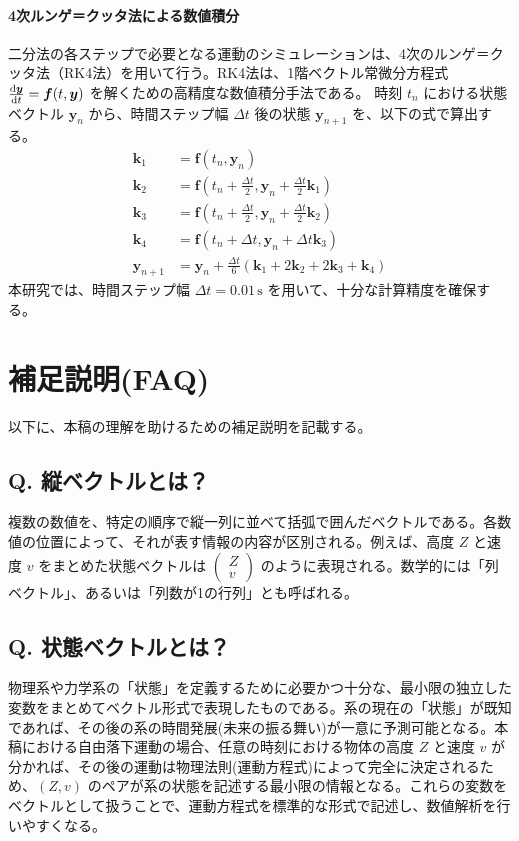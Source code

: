\documentclass[a4paper,12pt]{article}
\begin{document}
\paragraph{4次ルンゲ＝クッタ法による数値積分}
\label{par:rk4}
二分法の各ステップで必要となる運動のシミュレーションは、4次のルンゲ＝クッタ法（RK4法）を用いて行う。RK4法は、1階ベクトル常微分方程式 $\dv{\bm{y}}{t} = \bm{f}(t, \bm{y})$ を解くための高精度な数値積分手法である。
時刻 $t_n$ における状態ベクトル $\bm{y}_n$ から、時間ステップ幅 $\Delta t$ 後の状態 $\bm{y}_{n+1}$ を、以下の式で算出する。
\begin{align*}
    \bm{k}_1 &= \bm{f}(t_n, \bm{y}_n) \\
    \bm{k}_2 &= \bm{f}\left(t_n + \frac{\Delta t}{2}, \bm{y}_n + \frac{\Delta t}{2}\bm{k}_1\right) \\
    \bm{k}_3 &= \bm{f}\left(t_n + \frac{\Delta t}{2}, \bm{y}_n + \frac{\Delta t}{2}\bm{k}_2\right) \\
    \bm{k}_4 &= \bm{f}(t_n + \Delta t, \bm{y}_n + \Delta t \bm{k}_3) \\
    \bm{y}_{n+1} &= \bm{y}_n + \frac{\Delta t}{6}(\bm{k}_1 + 2\bm{k}_2 + 2\bm{k}_3 + \bm{k}_4)
\end{align*}
本研究では、時間ステップ幅 $\Delta t = 0.01 \, \mathrm{s}$ を用いて、十分な計算精度を確保する。



\section{補足説明(FAQ)}
\label{sec:faq}

以下に、本稿の理解を助けるための補足説明を記載する。

\subsection*{Q. 縦ベクトルとは？}
複数の数値を、特定の順序で縦一列に並べて括弧で囲んだベクトルである。各数値の位置によって、それが表す情報の内容が区別される。例えば、高度 $Z$ と速度 $v$ をまとめた状態ベクトルは $\begin{pmatrix} Z \\ v \end{pmatrix}$ のように表現される。数学的には「列ベクトル」、あるいは「列数が1の行列」とも呼ばれる。

\subsection*{Q. 状態ベクトルとは？}
物理系や力学系の「状態」を定義するために必要かつ十分な、最小限の独立した変数をまとめてベクトル形式で表現したものである。系の現在の「状態」が既知であれば、その後の系の時間発展(未来の振る舞い)が一意に予測可能となる。本稿における自由落下運動の場合、任意の時刻における物体の高度 $Z$ と速度 $v$ が分かれば、その後の運動は物理法則(運動方程式)によって完全に決定されるため、$(Z, v)$ のペアが系の状態を記述する最小限の情報となる。これらの変数をベクトルとして扱うことで、運動方程式を標準的な形式で記述し、数値解析を行いやすくなる。
\end{document}
